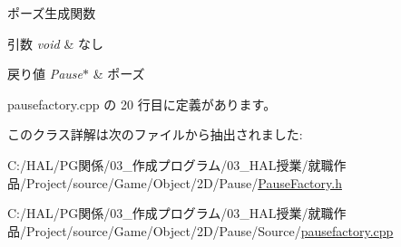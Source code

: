 ポーズ生成関数 


\begin{DoxyParams}{引数}
{\em void} & なし \\
\hline
\end{DoxyParams}

\begin{DoxyRetVals}{戻り値}
{\em Pause$\ast$} & ポーズ \\
\hline
\end{DoxyRetVals}


 pausefactory.\+cpp の 20 行目に定義があります。



このクラス詳解は次のファイルから抽出されました\+:\begin{DoxyCompactItemize}
\item 
C\+:/\+H\+A\+L/\+P\+G関係/03\+\_\+作成プログラム/03\+\_\+\+H\+A\+L授業/就職作品/\+Project/source/\+Game/\+Object/2\+D/\+Pause/\mbox{\hyperlink{_pause_factory_8h}{Pause\+Factory.\+h}}\item 
C\+:/\+H\+A\+L/\+P\+G関係/03\+\_\+作成プログラム/03\+\_\+\+H\+A\+L授業/就職作品/\+Project/source/\+Game/\+Object/2\+D/\+Pause/\+Source/\mbox{\hyperlink{pausefactory_8cpp}{pausefactory.\+cpp}}\end{DoxyCompactItemize}
